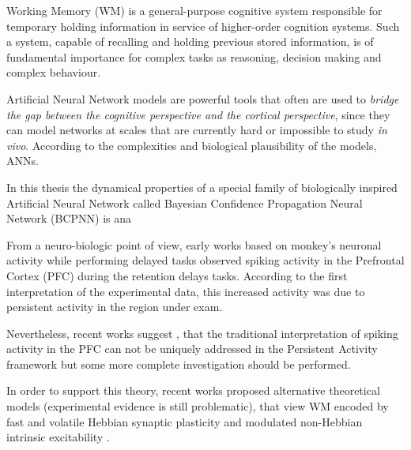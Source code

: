

Working Memory (WM) is a general-purpose cognitive system responsible for temporary holding information in service of higher-order cognition systems. Such a system, capable of recalling and holding previous stored information, is of fundamental importance for complex tasks as reasoning, decision making and complex behaviour.

Artificial Neural Network models are powerful tools that often are used to \textit{bridge the gap between the cognitive perspective and the cortical perspective}, since they can model networks at scales that are currently hard or impossible to study \textit{in vivo}. According to the complexities and biological plausibility of the models, ANNs.  

In this thesis the dynamical properties of a special family of biologically inspired Artificial Neural Network called Bayesian Confidence Propagation Neural Network (BCPNN) is ana

    
    From a neuro-biologic point of view, early works based on monkey's neuronal activity while performing delayed tasks \cite{Fuster652} observed spiking activity in the Prefrontal Cortex (PFC) during the retention delays tasks. According to the first interpretation of the experimental data, this increased activity was due to persistent activity in the region under exam. 
    
    Nevertheless, recent works suggest \cite{Shafi2007VariabilityIN}, \cite{lundqvist2018working} that the traditional interpretation of spiking activity in the PFC can not be uniquely addressed in the Persistent Activity framework but some more complete investigation should be performed.
    
     In order to support this theory, recent works proposed alternative theoretical models (experimental evidence is still problematic), that view WM encoded by fast and volatile Hebbian synaptic plasticity and modulated non-Hebbian intrinsic excitability \cite{LansnerFRC}.